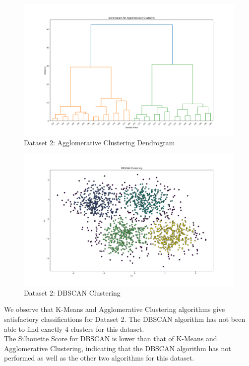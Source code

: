 \begin{figure}[H]
    \centering
    \includegraphics[width=0.75\linewidth]{Images/Clusters-5-v1-Agglomerative-Dendrogram.png}
    \caption{Dataset 2: Agglomerative Clustering Dendrogram}
    \label{fig:clusters-5-v1-agglomerative-dendrogram}
\end{figure}

\begin{figure}[H]
	\centering
	\includegraphics[width=0.75\linewidth]{Images/Clusters-5-v1-DBSCAN Clustering.png}
	\caption{Dataset 2: DBSCAN Clustering}
	\label{fig:clusters-5-v1-dbscan-clustering}
\end{figure}

We observe that K-Means and Agglomerative Clustering algorithms give satisfactory classifications for Dataset 2. The DBSCAN algorithm has not been able to find exactly 4 clusters for this dataset. \\

The Silhouette Score for DBSCAN is lower than that of K-Means and Agglomerative Clustering, indicating that the DBSCAN algorithm has not performed as well as the other two algorithms for this dataset.

\clearpage

